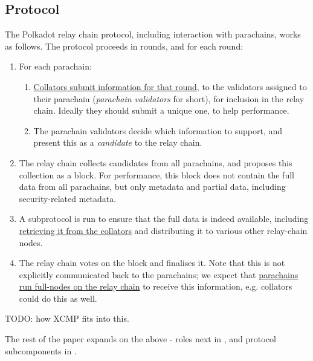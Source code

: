 \subsection{Protocol}

The Polkadot relay chain protocol, including interaction with parachains, works as follows. The protocol proceeds in rounds, and for each round:

\begin{enumerate}
\item For each parachain:

  \begin{enumerate}
    \item \uline{Collators submit information for that round}, to the validators assigned to their parachain (\emph{parachain validators} for short), for inclusion in the relay chain. Ideally they should submit a unique one, to help performance.
    \item The parachain validators decide which information to support, and present this as a \emph{candidate} to the relay chain.
  \end{enumerate}

\item The relay chain collects candidates from all parachains, and proposes this collection as a block. For performance, this block does not contain the full data from all parachains, but only metadata and partial data, including security-related metadata.

\item A subprotocol is run to ensure that the full data is indeed available, including \uline{retrieving it from the collators} and distributing it to various other relay-chain nodes.

\item The relay chain votes on the block and finalises it. Note that this is not explicitly communicated back to the parachains; we expect that \uline{parachains run full-nodes on the relay chain} to receive this information, e.g. collators could do this as well.
\end{enumerate}

TODO: how XCMP fits into this.


The rest of the paper expands on the above - roles next in , and protocol subcomponents in .
